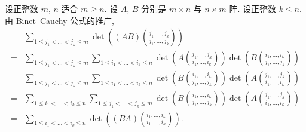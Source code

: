 \begin{example}
    设正整数 \(m\), \(n\) 适合 \(m \geq n\).
    设 \(A\), \(B\) 分别是 \(m \times n\) 与 \(n \times m\) 阵.
    设正整数 \(k \leq n\).
    由 Binet--Cauchy 公式的推广,
    \begin{align*}
             &
        \sum_{1 \leq j_1 < \dots < j_k \leq m}
        \det {\left(
            (AB)\binom{j_1,\dots,j_k}{j_1,\dots,j_k}
            \right)}
        \\
        = {} &
        \sum_{1 \leq j_1 < \dots < j_k \leq m}
        \sum_{1 \leq i_1 < \dots < i_k \leq n}
        \det {\left(
            A\binom{j_1,\dots,j_k}{i_1,\dots,i_k}
            \right)}
        \det {\left(
            B\binom{i_1,\dots,i_k}{j_1,\dots,j_k}
            \right)}
        \\
        = {} &
        \sum_{1 \leq j_1 < \dots < j_k \leq m}
        \sum_{1 \leq i_1 < \dots < i_k \leq n}
        \det {\left(
            B\binom{i_1,\dots,i_k}{j_1,\dots,j_k}
            \right)}
        \det {\left(
            A\binom{j_1,\dots,j_k}{i_1,\dots,i_k}
            \right)}
        \\
        = {} &
        \sum_{1 \leq i_1 < \dots < i_k \leq n}
        \sum_{1 \leq j_1 < \dots < j_k \leq m}
        \det {\left(
            B\binom{i_1,\dots,i_k}{j_1,\dots,j_k}
            \right)}
        \det {\left(
            A\binom{j_1,\dots,j_k}{i_1,\dots,i_k}
            \right)}
        \\
        = {} &
        \sum_{1 \leq i_1 < \dots < i_k \leq n}
        \det {\left(
            (BA)\binom{i_1,\dots,i_k}{i_1,\dots,i_k}
            \right)}.
    \end{align*}
\end{example}

